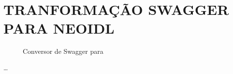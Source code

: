 

\chapter{TRANFORMAÇÃO SWAGGER PARA NEOIDL}
\label{scriptSwagger2NeoIDL}
\vspace{-6mm}

\begin{figure}[h]
\begin{small}

\vspace{-.5cm}
\end{small}
\caption{Conversor de Swagger para \neoidl{}}
\label{lst:swagger2NeoIDL}
\end{figure}

\ldots 
